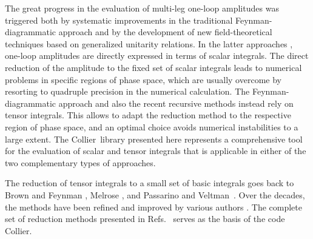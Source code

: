 \documentclass[preprint,sort&compress,12pt]{elsarticle}
\def\citeres#1{\mbox{Refs.~\cite{#1}}}
\newcommand{\collier}{{\sc Collier}}
\begin{document}
The great progress in the evaluation of multi-leg one-loop amplitudes
was triggered both by systematic improvements in the traditional
Feynman-diagrammatic approach and by the development of new
field-theoretical techniques based on generalized unitarity relations.
In the latter approaches \cite{Bern:1994zx, Bern:1994cg,
  Britto:2004nc, Ossola:2006us, Ellis:2007br,Giele:2008ve,
  Ellis:2008ir}, 
one-loop amplitudes are directly expressed in terms
of scalar integrals. 
The direct reduction of the amplitude to
the fixed set of scalar integrals leads to numerical problems in
specific regions of phase space, which are usually overcome by
resorting to quadruple precision in the numerical calculation. The
Feynman-diagrammatic approach and also the recent recursive methods
\cite{Cascioli:2011va,Actis:2012qn,vanHameren:2009vq} instead rely on
tensor integrals. This allows to adapt the reduction method to the
respective region of phase space, and an optimal choice avoids
numerical instabilities to a large extent.  The \collier\ library
presented here represents a comprehensive tool for the evaluation of
scalar and tensor integrals that is applicable in either of the two
complementary types of approaches.

The reduction of tensor integrals to a small set of basic integrals
goes back to Brown and Feynman \cite{Brown:1952eu}, Melrose
\cite{Melrose:1965kb}, and Passarino and
Veltman~\cite{Passarino:1978jh}. 
Over the decades, the methods have been refined and
improved by various authors
\cite{vanNeerven:1983vr,vanOldenborgh:1989wn,
  Bern:1992em,Denner:1991kt,
Binoth:1999sp,Denner:2002ii,Beenakker:2002nc, 
Dittmaier:2003bc,
Duplancic:2003tv,
Giele:2004iy,Giele:2004ub,%
Binoth:2005ff,
Denner:2005nn,
Fleischer:2010sq}. %
The complete set of reduction methods presented in
\citeres{Denner:2002ii,Denner:2005nn} serves as the basis of the code
\collier.
\end{document}
